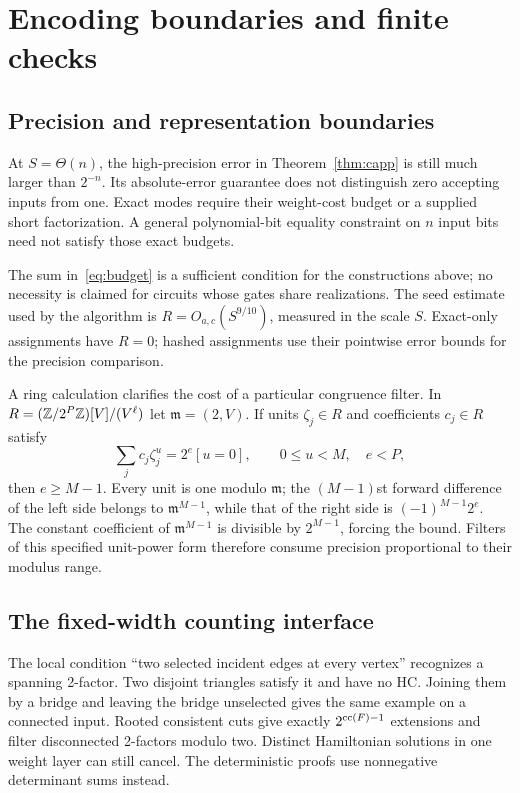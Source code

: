 \section{Encoding boundaries and finite checks}
\label{sec:checks}

\subsection{Precision and representation boundaries}

At $S=\Theta(n)$, the high-precision error in
Theorem~\ref{thm:capp} is still much larger than $2^{-n}$. Its
absolute-error guarantee does not distinguish zero accepting inputs
from one. Exact modes require their weight-cost budget or a supplied
short factorization. A general polynomial-bit equality constraint on
$n$ input bits need not satisfy those exact budgets.

The sum in~\eqref{eq:budget} is a sufficient condition for the
constructions above; no necessity is claimed for circuits whose
gates share realizations. The seed estimate used by
the algorithm is $R=O_{a,c}(S^{9/10})$, measured in the scale $S$.
Exact-only assignments have $R=0$; hashed assignments use their
pointwise error bounds for the precision comparison.

A ring calculation clarifies the cost of a particular congruence
filter. In $R=(\mathbb Z/2^P\mathbb Z)[V]/(V^\ell)$ let $\mathfrak m=(2,V)$.
If units $\zeta_j\in R$ and coefficients $c_j\in R$ satisfy
\[
 \sum_jc_j\zeta_j^u=2^e[u=0],\qquad 0\le u<M,\quad e<P,
\]
then $e\ge M-1$. Every unit is one modulo $\mathfrak m$; the
$(M-1)$st forward difference of the left side belongs to
$\mathfrak m^{M-1}$, while that of the right side is
$(-1)^{M-1}2^e$. The constant coefficient of
$\mathfrak m^{M-1}$ is divisible by $2^{M-1}$, forcing the bound.
Filters of this specified unit-power form therefore consume precision
proportional to their modulus range.

\subsection{The fixed-width counting interface}

The local condition ``two selected incident edges at every vertex''
recognizes a spanning 2-factor. Two disjoint triangles satisfy it and
have no HC. Joining them by a bridge and leaving the bridge unselected
gives the same example on a connected input. Rooted consistent cuts
give exactly $2^{\operatorname{cc}(F)-1}$ extensions and filter disconnected
2-factors modulo two. Distinct Hamiltonian solutions in one weight
layer can still cancel. The deterministic proofs use nonnegative
determinant sums instead.

